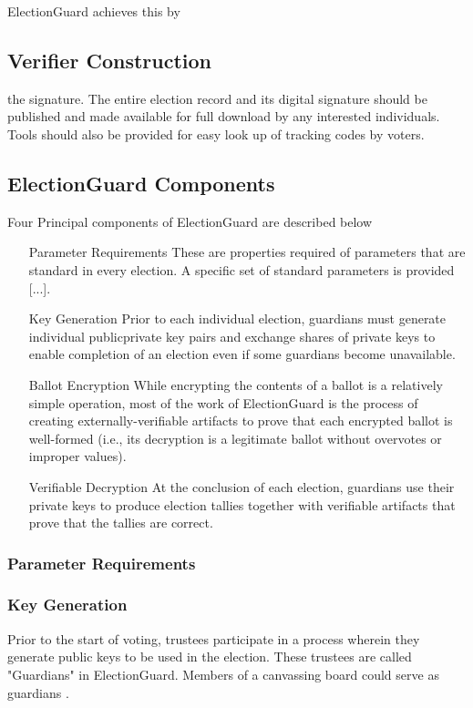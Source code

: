 ElectionGuard achieves this by

\subsection{Verifier Construction}
the signature. The entire election record and its digital signature should be
\cite[25]{eg-spec}
published and made available for full download by any interested individuals. Tools should also be provided for easy
look up of tracking codes by voters.
\cite[25]{eg-spec}

\subsection{ElectionGuard Components}
Four Principal components of ElectionGuard are described below \cite[3-4]{eg-spec}
\begin{itemize}
    \item[Parameter Requirements] These are properties required of parameters that are standard in every election. A
    specific set of standard parameters is provided [...].
    \item[Key Generation] Prior to each individual election, guardians must generate individual publicprivate key
    pairs and exchange shares of private keys to enable completion of an election even if some guardians become
    unavailable.
    \item[Ballot Encryption] While encrypting the contents of a ballot is a relatively simple operation, most of the
    work of ElectionGuard is the process of creating externally-verifiable artifacts to prove that each
    encrypted ballot is well-formed (i.e., its decryption is a legitimate ballot without overvotes or improper values).
    \item[Verifiable Decryption]
    At the conclusion of each election, guardians use their private keys to produce election tallies
    together with verifiable artifacts that prove that the tallies are correct.
\end{itemize}

\subsubsection{Parameter Requirements}

\subsubsection{Key Generation}
Prior to the start of voting, trustees participate in a process wherein they generate public keys to be used in the
election. These trustees are called "Guardians" in ElectionGuard. Members of a canvassing board could serve as
guardians \cite[2]{eg-spec}.

